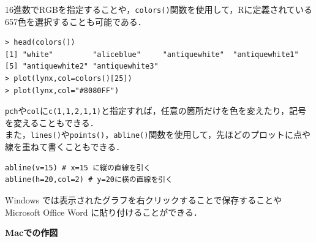 \documentclass[a4paper,10pt,fleqn]{jarticle}
\begin{document}
16進数でRGBを指定することや，\verb+colors()+関数を使用して，Rに定義されている657色を選択することも可能である．
\begin{breakbox}
\begin{verbatim}
> head(colors())
[1] "white"         "aliceblue"     "antiquewhite"  "antiquewhite1"
[5] "antiquewhite2" "antiquewhite3"
> plot(lynx,col=colors()[25])
> plot(lynx,col="#8080FF")
\end{verbatim}
\end{breakbox}
{\tt pch}や{\tt col}に\verb+c(1,1,2,1,1)+と指定すれば，任意の箇所だけを色を変えたり，記号を変えることもできる．\\
また，{\tt lines()}や{\tt points()}，{\tt abline()}関数を使用して，先ほどのプロットに点や線を重ねて書くこともできる．
\begin{screen}
\begin{verbatim}
abline(v=15) # x=15 に縦の直線を引く
abline(h=20,col=2) # y=20に横の直線を引く
\end{verbatim}
\end{screen}

Windows では表示されたグラフを右クリックすることで保存することや Microsoft Office Word に貼り付けることができる．




\noindent
{\bf \large{Macでの作図}}
\end{document}
